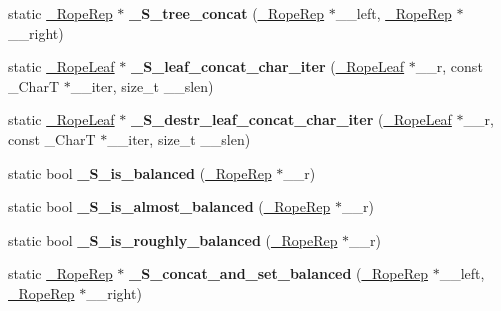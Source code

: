 \begin{DoxyCompactItemize}
\item 
\mbox{\label{classrope_a60e7f5db4756fc2cc11fc0b10625e550}} 
static \hyperlink{struct___rope___rope_rep}{\+\_\+\+Rope\+Rep} $\ast$ {\bfseries \+\_\+\+S\+\_\+tree\+\_\+concat} (\hyperlink{struct___rope___rope_rep}{\+\_\+\+Rope\+Rep} $\ast$\+\_\+\+\_\+left, \hyperlink{struct___rope___rope_rep}{\+\_\+\+Rope\+Rep} $\ast$\+\_\+\+\_\+right)
\item 
\mbox{\label{classrope_af687826222bf424558d96eaf70acfc22}} 
static \hyperlink{struct___rope___rope_leaf}{\+\_\+\+Rope\+Leaf} $\ast$ {\bfseries \+\_\+\+S\+\_\+leaf\+\_\+concat\+\_\+char\+\_\+iter} (\hyperlink{struct___rope___rope_leaf}{\+\_\+\+Rope\+Leaf} $\ast$\+\_\+\+\_\+r, const \+\_\+\+CharT $\ast$\+\_\+\+\_\+iter, size\+\_\+t \+\_\+\+\_\+slen)
\item 
\mbox{\label{classrope_a0e71f81797cc1045ccf788135e4c708a}} 
static \hyperlink{struct___rope___rope_leaf}{\+\_\+\+Rope\+Leaf} $\ast$ {\bfseries \+\_\+\+S\+\_\+destr\+\_\+leaf\+\_\+concat\+\_\+char\+\_\+iter} (\hyperlink{struct___rope___rope_leaf}{\+\_\+\+Rope\+Leaf} $\ast$\+\_\+\+\_\+r, const \+\_\+\+CharT $\ast$\+\_\+\+\_\+iter, size\+\_\+t \+\_\+\+\_\+slen)
\item 
\mbox{\label{classrope_abb13c6a472965481fb53c0214f0ae9e2}} 
static bool {\bfseries \+\_\+\+S\+\_\+is\+\_\+balanced} (\hyperlink{struct___rope___rope_rep}{\+\_\+\+Rope\+Rep} $\ast$\+\_\+\+\_\+r)
\item 
\mbox{\label{classrope_a258d2e6d5c8f291aebb909ab38669f4e}} 
static bool {\bfseries \+\_\+\+S\+\_\+is\+\_\+almost\+\_\+balanced} (\hyperlink{struct___rope___rope_rep}{\+\_\+\+Rope\+Rep} $\ast$\+\_\+\+\_\+r)
\item 
\mbox{\label{classrope_ab2c8ce7a71a5337fe8184923705cf385}} 
static bool {\bfseries \+\_\+\+S\+\_\+is\+\_\+roughly\+\_\+balanced} (\hyperlink{struct___rope___rope_rep}{\+\_\+\+Rope\+Rep} $\ast$\+\_\+\+\_\+r)
\item 
\mbox{\label{classrope_a70d5d98df695bcd4587bcf34fd403d97}} 
static \hyperlink{struct___rope___rope_rep}{\+\_\+\+Rope\+Rep} $\ast$ {\bfseries \+\_\+\+S\+\_\+concat\+\_\+and\+\_\+set\+\_\+balanced} (\hyperlink{struct___rope___rope_rep}{\+\_\+\+Rope\+Rep} $\ast$\+\_\+\+\_\+left, \hyperlink{struct___rope___rope_rep}{\+\_\+\+Rope\+Rep} $\ast$\+\_\+\+\_\+right)

\end{DoxyCompactItemize}

